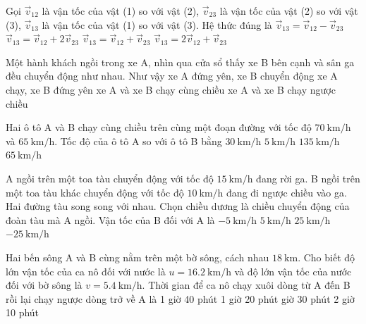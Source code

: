 \begin{ex}
	Gọi $\vec{v}_{12}$ là vận tốc của vật (1) so với vật (2), $\vec{v}_{23}$ là vận tốc của vật (2) so với vật (3), $\vec{v}_{13}$ là vận tốc của vật (1) so với vật (3). Hệ thức đúng là
	\choice
	{$\vec{v}_{13}=\vec{v}_{12}-\vec{v}_{23}$}
	{$\vec{v}_{13}=\vec{v}_{12}+2\vec{v}_{23}$}
	{\True $\vec{v}_{13}=\vec{v}_{12}+\vec{v}_{23}$}
	{$\vec{v}_{13}=2\vec{v}_{12}+\vec{v}_{23}$}
	\loigiai{}
\end{ex}
\begin{ex}
	Một hành khách ngồi trong xe A, nhìn qua cửa sổ thấy xe B bên cạnh và sân ga đều chuyển động như nhau. Như vậy
	\choice
	{xe A đứng yên, xe B chuyển động}
	{\True xe A chạy, xe B đứng yên}
	{xe A và xe B chạy cùng chiều}
	{xe A và xe B chạy ngược chiều}
	\loigiai{}
\end{ex}
\begin{ex}
	Hai ô tô A và B chạy cùng chiều trên cùng một đoạn đường với tốc độ $\SI{70}{\kilo\meter/\hour}$ và $\SI{65}{\kilo\meter/\hour}$. Tốc độ của ô tô A so với ô tô B bằng	
	\choice
	{$\SI{30}{\kilo\meter/\hour}$}
	{\True $\SI{5}{\kilo\meter/\hour}$}
	{$\SI{135}{\kilo\meter/\hour}$}
	{$\SI{65}{\kilo\meter/\hour}$}
	\loigiai{}
\end{ex}
\begin{ex}
	A ngồi trên một toa tàu chuyển động với tốc độ $\SI{15}{\kilo\meter/\hour}$ đang rời ga. B ngồi trên một toa tàu khác chuyển động với tốc độ $\SI{10}{\kilo\meter/\hour}$ đang đi ngược chiều vào ga. Hai đường tàu song song với nhau. Chọn chiều dương là chiều chuyển động của đoàn tàu mà A ngồi. Vận tốc của B đối với A là
	\choice
	{$\SI{-5}{\kilo\meter/\hour}$}
	{$\SI{5}{\kilo\meter/\hour}$}
	{$\SI{25}{\kilo\meter/\hour}$}
	{\True $\SI{-25}{\kilo\meter/\hour}$}
	\loigiai{}
\end{ex}
\begin{ex}
	Hai bến sông A và B cùng nằm trên một bờ sông, cách nhau $\SI{18}{\kilo\meter}$. Cho biết độ lớn vận tốc của ca nô đối với nước là $u =\SI{16.2}{\kilo\meter/\hour}$ và độ lớn vận tốc của nước đối với bờ sông là $v=\SI{5.4}{\kilo\meter/\hour}$. Thời gian để ca nô chạy xuôi dòng từ A đến B rồi lại chạy ngược dòng trở về A là	
	\choice
	{1 giờ 40 phút}
	{1 giờ 20 phút}
	{ giờ 30 phút}
	{2 giờ 10 phút}
	\loigiai{}
\end{ex}
